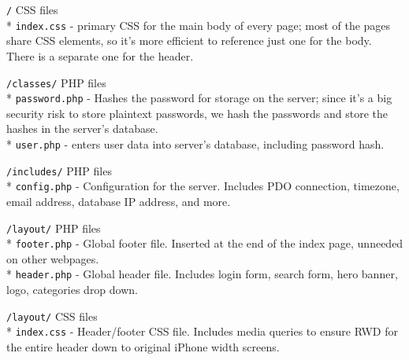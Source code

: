 \documentclass[11pt]{article}
\begin{document}
\texttt{/} CSS files\\*
\texttt{index.css} - primary CSS for the main body of every page; most of the pages share CSS elements, so it's more efficient to reference just one for the body. There is a separate one for the header.

\texttt{/classes/} PHP files\\*
\texttt{password.php} - Hashes the password for storage on the server; since it's a big security risk to store plaintext passwords, we hash the passwords and store the hashes in the server's database.\\*
\texttt{user.php} - enters user data into server's database, including password hash.

\texttt{/includes/} PHP files\\*
\texttt{config.php} - Configuration for the server. Includes PDO connection, timezone, email address, database IP address, and more.

\texttt{/layout/} PHP files\\*
\texttt{footer.php} - Global footer file. Inserted at the end of the index page, unneeded on other webpages.\\*
\texttt{header.php} - Global header file. Includes login form, search form, hero banner, logo, categories drop down.

\texttt{/layout/} CSS files\\*
\texttt{index.css} - Header/footer CSS file. Includes media queries to ensure RWD for the entire header down to original iPhone width screens.
\end{document}
